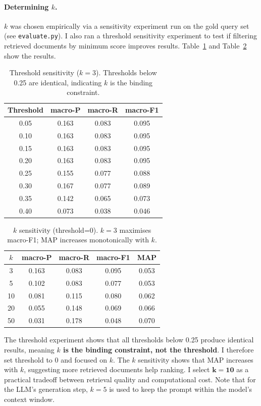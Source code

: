 \documentclass[a4paper,11pt]{article}
\begin{document}
\paragraph{Determining $k$.}
$k$ was chosen empirically via a sensitivity experiment run on the gold query set (see \texttt{evaluate.py}). I also ran a threshold sensitivity experiment to test if filtering retrieved documents by minimum score improves results. Table~\ref{tab:threshold} and Table~\ref{tab:k} show the results.

\begin{table}[h]
\centering
\caption{Threshold sensitivity ($k=3$). Thresholds below 0.25 are identical, indicating $k$ is the binding constraint.}
\label{tab:threshold}
\begin{tabular}{cccc}
\hline
\textbf{Threshold} & \textbf{macro-P} & \textbf{macro-R} & \textbf{macro-F1} \\
\hline
0.05 & 0.163 & 0.083 & 0.095 \\
0.10 & 0.163 & 0.083 & 0.095 \\
0.15 & 0.163 & 0.083 & 0.095 \\
0.20 & 0.163 & 0.083 & 0.095 \\
0.25 & 0.155 & 0.077 & 0.088 \\
0.30 & 0.167 & 0.077 & 0.089 \\
0.35 & 0.142 & 0.065 & 0.073 \\
0.40 & 0.073 & 0.038 & 0.046 \\
\hline
\end{tabular}
\end{table}

\begin{table}[h]
\centering
\caption{$k$ sensitivity (threshold=0). $k=3$ maximises macro-F1; MAP increases monotonically with $k$.}
\label{tab:k}
\begin{tabular}{ccccc}
\hline
$k$ & \textbf{macro-P} & \textbf{macro-R} & \textbf{macro-F1} & \textbf{MAP} \\
\hline
3  & 0.163 & 0.083 & 0.095 & 0.053 \\
5  & 0.102 & 0.083 & 0.077 & 0.053 \\
10 & 0.081 & 0.115 & 0.080 & 0.062 \\
20 & 0.055 & 0.148 & 0.069 & 0.066 \\
50 & 0.031 & 0.178 & 0.048 & 0.070 \\
\hline
\end{tabular}
\end{table}

The threshold experiment shows that all thresholds below 0.25 produce identical results, meaning \textbf{$k$ is the binding constraint, not the threshold}. I therefore set threshold to 0 and focused on $k$. 
\newpage 
The $k$ sensitivity shows that MAP increases with $k$, suggesting more retrieved documents help ranking. I select $\mathbf{k=10}$ as a practical tradeoff between retrieval quality and computational cost. Note that for the LLM's generation step, $k=5$ is used to keep the prompt within the model's context window.
\end{document}
